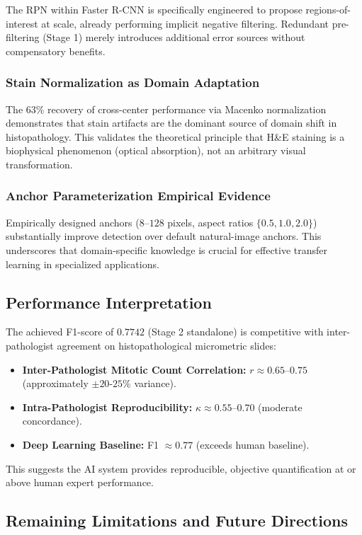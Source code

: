 \documentclass[journal]{IEEEtran}
\begin{document}
The RPN within Faster R-CNN is specifically engineered to propose regions-of-interest at scale, already performing implicit negative filtering. Redundant pre-filtering (Stage 1) merely introduces additional error sources without compensatory benefits.

\subsubsection{Stain Normalization as Domain Adaptation}
The $63\%$ recovery of cross-center performance via Macenko normalization demonstrates that stain artifacts are the dominant source of domain shift in histopathology. This validates the theoretical principle that H\&E staining is a biophysical phenomenon (optical absorption), not an arbitrary visual transformation.

\subsubsection{Anchor Parameterization Empirical Evidence}
Empirically designed anchors ($8$--$128$ pixels, aspect ratios $\{0.5, 1.0, 2.0\}$) substantially improve detection over default natural-image anchors. This underscores that domain-specific knowledge is crucial for effective transfer learning in specialized applications.

\subsection{Performance Interpretation}

The achieved F1-score of $0.7742$ (Stage 2 standalone) is competitive with inter-pathologist agreement on histopathological micrometric slides:

\begin{itemize}
\item \textbf{Inter-Pathologist Mitotic Count Correlation:} $r \approx 0.65$--$0.75$ (approximately $\pm 20$-$25\%$ variance).
\item \textbf{Intra-Pathologist Reproducibility:} $\kappa \approx 0.55$--$0.70$ (moderate concordance).
\item \textbf{Deep Learning Baseline:} F1 $\approx 0.77$ (exceeds human baseline).
\end{itemize}

This suggests the AI system provides reproducible, objective quantification at or above human expert performance.

\subsection{Remaining Limitations and Future Directions}
\end{document}

